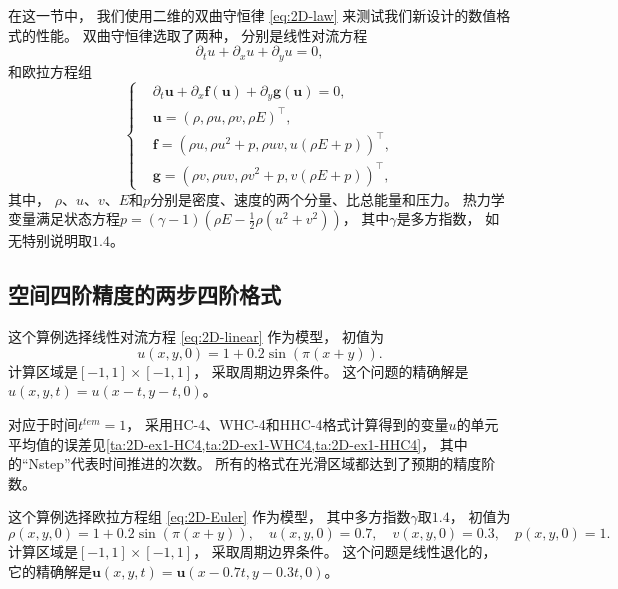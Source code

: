 在这一节中，
我们使用二维的双曲守恒律 \cref{eq:2D-law} 来测试我们新设计的数值格式的性能。
双曲守恒律选取了两种，
分别是线性对流方程
\begin{equation}
  \label{eq:2D-linear}
  {\partial_{t}}u + {\partial_{x}}u + {\partial_{y}}u = 0,
\end{equation}
和欧拉方程组
\begin{equation}
  \label{eq:2D-Euler}
  \left\{
  \begin{aligned}
     & {\partial_{t}}{\bm{u}}+{\partial_{x}}{\bm{f}}({\bm{u}})+{\partial_{y}}{\bm{g}}({\bm{u}})=0, \\
     & {\bm{u}}=(\rho, \rho u, \rho v, \rho E)^\top,                                               \\
     & {\bm{f}}=(\rho u, \rho u^2+p, \rho uv, u (\rho E+p))^\top,                                  \\
     & {\bm{g}}=(\rho v, \rho uv, \rho v^2+p, v (\rho E+p))^\top,
  \end{aligned}
  \right.
\end{equation}
其中，
$\rho$、$u$、$v$、$E$和$p$分别是密度、速度的两个分量、比总能量和压力。
热力学变量满足状态方程$p= (\gamma-1) (\rho E - \frac 12 \rho(u^2+v^2))$，
其中$\gamma$是多方指数，
如无特别说明取$1.4$。

\subsection{空间四阶精度的两步四阶格式}
\label{sec:2D-linear-rec-examples}

\begin{example}[二维线性对流方程的精度测试]
  \label{ex:2D-acc1}
  这个算例选择线性对流方程 \cref{eq:2D-linear} 作为模型，
  初值为
  \begin{equation}
    u(x,y,0) = 1 + 0.2\sin(\pi (x+y)).
  \end{equation}
  计算区域是$[-1,1]\times[-1,1]$，
  采取周期边界条件。
  这个问题的精确解是$u(x,y,t) = u(x-t,y-t,0)$。
\end{example}

对应于时间$t^{tem}=1$，
采用HC-4、WHC-4和HHC-4格式计算得到的变量$u$的单元平均值的误差见\cref{ta:2D-ex1-HC4,ta:2D-ex1-WHC4,ta:2D-ex1-HHC4}，
其中的“Nstep”代表时间推进的次数。
所有的格式在光滑区域都达到了预期的精度阶数。



\begin{example}[二维欧拉方程组的线性退化的精度测试]
  \label{ex:2D-acc2}
  这个算例选择欧拉方程组 \cref{eq:2D-Euler} 作为模型，
  其中多方指数$\gamma$取$1.4$，
  初值为
  \begin{equation}
    \rho(x,y,0) = 1 + 0.2\sin(\pi(x+y)), \quad u(x,y,0)=0.7, \quad v(x,y,0)=0.3, \quad p(x,y,0)=1.
  \end{equation}
  计算区域是$[-1,1]\times[-1,1]$，
  采取周期边界条件。
  这个问题是线性退化的，
  它的精确解是${\bm{u}}(x,y,t) = {\bm{u}}(x-0.7t,y-0.3t,0)$。
\end{example}

